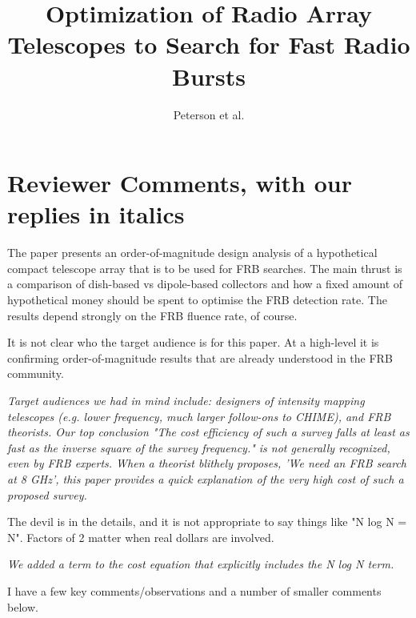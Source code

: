 \documentclass{article}
\begin{document}
\title{ Optimization of Radio Array Telescopes to Search for Fast Radio Bursts }
\author{Peterson et al.}

\maketitle

\section{Reviewer Comments, with our replies in italics}

The paper presents an order-of-magnitude design analysis of a hypothetical compact telescope array that is to be used for FRB searches. The main thrust is a comparison of dish-based vs dipole-based collectors and how a fixed amount of hypothetical money should be spent to optimise the FRB detection rate. The results depend strongly on the FRB fluence rate, of course.

It is not clear who the target audience is for this paper. At a high-level it is confirming order-of-magnitude results that are already understood in the FRB community. 

{\it Target audiences we had in mind include: designers of intensity mapping telescopes (e.g. lower frequency, much larger follow-ons to CHIME), and FRB theorists.  Our top conclusion "The cost efficiency of such a survey falls at least as fast as the inverse square of the survey frequency." is not generally recognized, even by FRB experts. When a theorist blithely proposes, 'We need an FRB search at 8 GHz', this paper provides a quick explanation of the very high cost of such a proposed survey.}

The devil is in the details, and it is not appropriate to say things like "N log N = N". Factors of 2 matter when real dollars are involved. 

{\it We added a term to the cost equation that explicitly includes the N log N term. }

I have a few key comments/observations and a number of smaller comments below.
\end{document}
